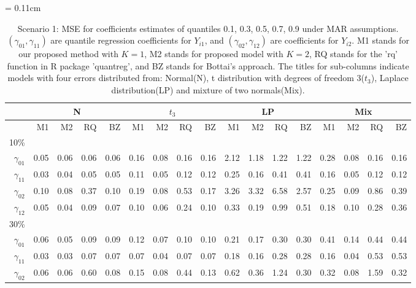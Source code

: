 \documentclass[useAMS,usenatbib,referee]{biom}
\begin{document}
  \begin{table}
\centering
    \caption{Scenario 1: MSE for coefficients estimates of quantiles 0.1, 0.3, 0.5, 0.7, 0.9 under MAR assumptions.
$(\gamma_{01}, \gamma_{11})$ are quantile regression coefficients for $Y_{i1}$, and $(\gamma_{02}, \gamma_{12})$ are coefficients for $Y_{i2}$. M1 stands for our proposed method with $K = 1$, M2 stands for proposed model with $K = 2$, RQ stands for the 'rq' function in R package 'quantreg', and BZ stands for Bottai's approach.
The titles for sub-columns indicate models with four errors distributed from: Normal(N), t distribution with degrees of freedom 3($t_3$),
Laplace distribution(LP) and mixture of two normals(Mix).
}\label{tab:simh2}
    \vspace{10pt} \tabcolsep = 0.11cm
    \begin{tabular}{rrrrrrrrrrrrrrrrr}
      \hline
              & \multicolumn{4}{c}{N} & \multicolumn{4}{c}{$t_3$}   & \multicolumn{4}{c}{LP}   & \multicolumn{4}{c}{Mix}   \\
      \hline
           & M1                      & M2 & RQ & BZ   & M1                      & M2 & RQ & BZ   & M1                      & M2 & RQ & BZ   & M1                      & M2 & RQ & BZ \\
10\%  \\
$\gamma_{01}$ & 0.05 & 0.06 & 0.06 & 0.06 & 0.16 & 0.08 & 0.16 & 0.16 & 2.12 & 1.18 & 1.22 & 1.22 & 0.28 & 0.08 & 0.16 & 0.16 \\
$\gamma_{11}$ & 0.03 & 0.04 & 0.05 & 0.05 & 0.11 & 0.05 & 0.12 & 0.12 & 0.25 & 0.16 & 0.41 & 0.41 & 0.16 & 0.05 & 0.12 & 0.12 \\
$\gamma_{02}$ & 0.10 & 0.08 & 0.37 & 0.10 & 0.19 & 0.08 & 0.53 & 0.17 & 3.26 & 3.32 & 6.58 & 2.57 & 0.25 & 0.09 & 0.86 & 0.39 \\
$\gamma_{12}$ & 0.05 & 0.04 & 0.09 & 0.07 & 0.10 & 0.06 & 0.24 & 0.10 & 0.33 & 0.19 & 0.99 & 0.51 & 0.18 & 0.10 & 0.28 & 0.36 \\
30\% \\
$\gamma_{01}$ & 0.06 & 0.05 & 0.09 & 0.09 & 0.12 & 0.07 & 0.10 & 0.10 & 0.21 & 0.17 & 0.30 & 0.30 & 0.41 & 0.14 & 0.44 & 0.44 \\
$\gamma_{11}$ & 0.03 & 0.03 & 0.07 & 0.07 & 0.07 & 0.04 & 0.07 & 0.07 & 0.18 & 0.16 & 0.28 & 0.28 & 0.16 & 0.04 & 0.53 & 0.53 \\
$\gamma_{02}$ & 0.06 & 0.06 & 0.60 & 0.08 & 0.15 & 0.08 & 0.44 & 0.13 & 0.62 & 0.36 & 1.24 & 0.30 & 0.32 & 0.08 & 1.59 & 0.32 \\

\end{tabular}
\end{table}
\end{document}
